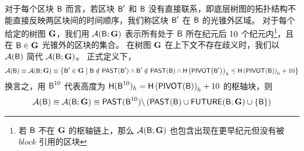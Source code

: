 对于每个区块 $\textsf{B}$ 而言，若区块 $\textsf{B}'$ 和 $\textsf{B}$ 没有直接联系，即底层树图的拓扑结构不能直接反映两区块间的时间顺序，我们称区块 $\textsf{B}'$ 在 $\textsf{B}$ 的光锥外区域。
对于每个给定的树图 $\textbf{G}$，我们用 $\mathcal{A}(\textsf{B};\textbf{G})$ 表示所有处于 $\textsf{B}$ 所在纪元后 ${10}$ 个纪元内\footnote{若 $\textsf{B}$ 不在 $\textbf{G}$ 的枢轴链上，那么 $\mathcal{A}(\textsf{B};\textbf{G})$ 也包含出现在更早纪元但没有被 $block$ 引用的区块}，且在 $\textsf{B}\in\textbf{G}$ 光锥外的区块的集合。
在树图 $\textbf{G}$ 在上下文不存在歧义时，我们以 $\mathcal{A}(\textsf{B})$ 简代 $\mathcal{A}(\textsf{B};\textbf{G})$。
正式定义下，
\begin{align}
	\mathcal{A}(\textsf{B})\equiv \mathcal{A}(\textsf{B};\textbf{G}) \equiv  {\left \{{\textsf{B}' \in \textbf{G}\;\big|\; \textsf{B}\notin\ensuremath{\mathsf{PAST}}(\textsf{B}') \land \textsf{B}'\notin\ensuremath{\mathsf{PAST}}(\textsf{B})  \land \textsf{H}\left(\ensuremath{\mathsf{PIVOT}{\left({\textsf{B}'} \right)}}\right)_h\le \textsf{H}\left(\ensuremath{\mathsf{PIVOT}{\left({\textsf{B}} \right)}}\right)_h+10 } \right \}}   
\end{align}
换言之，用 $\textsf{B}^{10}$ 代表高度为 $\textsf{H}(\textsf{B}^{10})_h=\textsf{H}\left(\mathsf{PIVOT}{\left({\textsf{B}} \right)}\right)_h+10$ 的枢轴块，则
\begin{align}
	\mathcal{A}(\textsf{B})\equiv \mathcal{A}(\textsf{B};\textbf{G}) \equiv \mathsf{PAST}(\textsf{B}^{10})\backslash\left( \mathsf{PAST}(\textsf{B})\cup \mathsf{FUTURE}(\textsf{B};\textbf{G}) \cup {\left \{{\textsf{B}} \right \}} \right)
\end{align}

